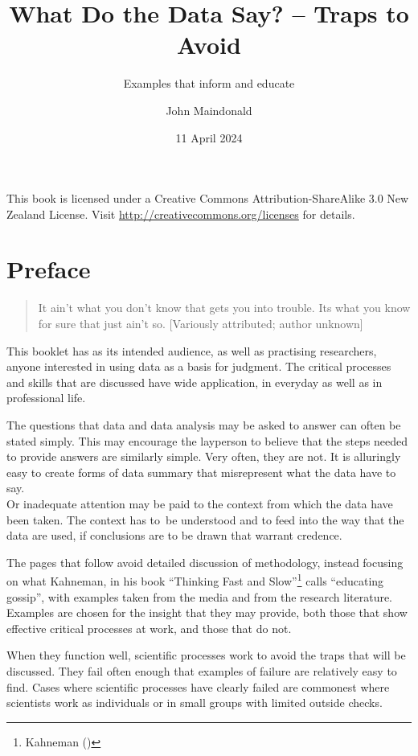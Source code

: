 \documentclass[
  10ptls,
  b5paper]{book}
\title{What Do the Data Say? -- Traps to Avoid}
\subtitle{Examples that inform and educate}
\author{John Maindonald}
\date{11 April 2024}
\begin{document}
\maketitle

\newpage
This book is licensed under a Creative
Commons Attribution-ShareAlike 3.0 New Zealand License.
Visit \url{http://creativecommons.org/licenses} for details.


{
\hypersetup{linkcolor=}
\setcounter{tocdepth}{1}
\tableofcontents
}
\renewcommand{\bibname}{References}

\chapter*{Preface}\label{preface}

\begin{quote}
It ain't what you don't know that gets you into trouble.
Its what you know for sure that just ain't so.
{[}Variously attributed; author unknown{]}
\end{quote}

This booklet has as its intended audience, as well as practising
researchers, anyone interested in using data as a basis for
judgment. The critical processes and skills that are discussed
have wide application, in everyday as well as in professional life.

The questions that data and data analysis may be asked to answer can
often be stated simply. This may encourage the layperson to believe
that the steps needed to provide answers are similarly simple.
Very often, they are not. It is alluringly easy to create forms of
data summary that misrepresent what the data have to say.\\
Or inadequate attention may be paid to the context from which the
data have been taken. The context has to~be understood and to feed
into the way that the data are used, if conclusions are to be drawn
that warrant credence.

The pages that follow avoid detailed discussion of methodology,
instead focusing on what Kahneman, in his book
``Thinking Fast and Slow''\footnote{Kahneman ()} calls ``educating gossip'',
with examples taken from the media and from the research literature.
Examples are chosen for the insight that they may provide, both
those that show effective critical processes at work, and those
that do not.

When they function well, scientific processes work to avoid the
traps that will be discussed. They fail often enough that examples
of failure are relatively easy to find. Cases where scientific
processes have clearly failed are commonest where scientists work
as individuals or in small groups with limited outside checks.
\end{document}
